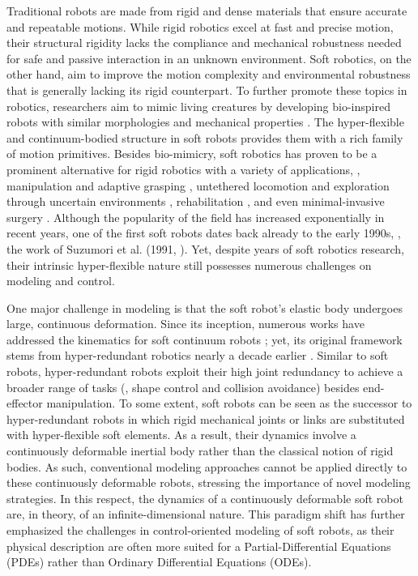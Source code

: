 Traditional robots are made from rigid and dense materials that ensure accurate and repeatable motions. While rigid robotics excel at fast and precise motion, their structural rigidity lacks the compliance and mechanical robustness needed for safe and passive interaction in an unknown environment. Soft robotics, on the other hand, aim to improve the motion complexity and environmental robustness that is generally lacking its rigid counterpart. To further promote these topics in robotics, researchers aim to mimic living creatures by developing bio-inspired robots with similar morphologies and mechanical properties \cite{Falkenhahn2015,Suzumori1991,Godage2015,Godage2016,Marchese2014,Kriegman2019}.
The hyper-flexible and continuum-bodied structure in soft robots provides them with a rich family of motion primitives. Besides bio-mimicry, soft robotics has proven to be a prominent alternative for rigid robotics with a variety of applications, \eg, manipulation and adaptive grasping \cite{Galloway2016}, untethered locomotion and exploration through uncertain environments \cite{Marchese2014,Choi2011,Pilz2020}, rehabilitation \cite{Polygerinos2015}, and even minimal-invasive surgery \cite{Li2017a,Cianchetti2014}. Although the popularity of the field has increased exponentially in recent years, one of the first soft robots dates back already to the early 1990s, \eg, the work of Suzumori et al. (1991, \cite{Suzumori1991}). Yet, despite years of soft robotics research, their intrinsic hyper-flexible nature still possesses numerous challenges on modeling and control.

One major challenge in modeling is that the soft robot's elastic body undergoes large, continuous deformation. Since its inception, numerous works have addressed the kinematics for soft continuum robots \cite{Jones2006,Mochiyama1999,Mochiyama2003}; yet, its original framework stems from hyper-redundant robotics nearly a decade earlier \cite{Chirikjian1994}. Similar to soft robots, hyper-redundant robots exploit their high joint redundancy to achieve a broader range of tasks (\eg, shape control and collision avoidance) besides end-effector manipulation. To some extent, soft robots can be seen as the successor to hyper-redundant robots in which rigid mechanical joints or links are substituted with hyper-flexible soft elements. As a result, their dynamics involve a continuously deformable inertial body rather than the classical notion of rigid bodies. As such, conventional modeling approaches cannot be applied directly to these continuously deformable robots, stressing the importance of novel modeling strategies. In this respect, the dynamics of a continuously deformable soft robot are, in theory, of an infinite-dimensional nature. This paradigm shift has further emphasized the challenges in control-oriented modeling of soft robots, as their physical description are often more suited for a Partial-Differential Equations (PDEs) rather than Ordinary Differential Equations (ODEs).

